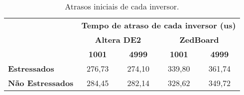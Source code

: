 \begin{table}[H]
\centering
\caption{Atrasos iniciais de cada inversor.}
\begin{tabular}{l|cccc|}
\cline{2-5}
 & \multicolumn{4}{c|}{\textbf{Tempo de atraso de cada inversor (us)}} \\ \cline{2-5} 
 & \multicolumn{2}{c|}{\textbf{Altera DE2}} & \multicolumn{2}{c|}{\textbf{ZedBoard}} \\ \cline{2-5} 
 & \multicolumn{1}{c|}{\textbf{1001}} & \multicolumn{1}{c|}{\textbf{4999}} & \multicolumn{1}{c|}{\textbf{1001}} & \textbf{4999} \\ \hline
\multicolumn{1}{|l|}{\textbf{Estressados}} & \multicolumn{1}{c|}{276,73} & \multicolumn{1}{c|}{274,10} & \multicolumn{1}{c|}{339,80} & 361,74 \\ \hline
\multicolumn{1}{|l|}{\textbf{Não Estressados}} & \multicolumn{1}{c|}{284,45} & \multicolumn{1}{c|}{282,14} & \multicolumn{1}{c|}{328,62} & 349,72 \\ \hline
\end{tabular}
\label{tab:AtrasosIniciais}
\end{table}